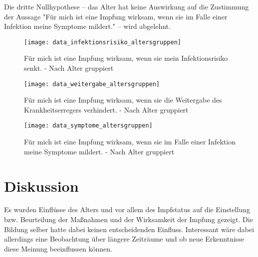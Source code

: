 Die dritte Nullhypothese -- das Alter hat keine Auswirkung auf die Zustimmung der Aussage "Für mich ist eine Impfung wirksam, wenn sie im Falle einer Infektion meine Symptome mildert." -- wird abgelehnt.

\begin{figure}[ht]
    \caption{Für mich ist eine Impfung wirksam, wenn sie mein Infektionsrisiko senkt. - Nach Alter gruppiert}
    \label{fig:vgl_infektionsrisiko_altersgruppen}
    \centering
    \texttt{[image: data\_infektionsrisiko\_altersgruppen]}
\end{figure}

\begin{figure}[ht]
    \caption{Für mich ist eine Impfung wirksam, wenn sie die Weitergabe des Krankheitserregers verhindert. - Nach Alter gruppiert}
    \label{fig:vgl_weitergabe_altersgruppen}
    \centering
    \texttt{[image: data\_weitergabe\_altersgruppen]}
\end{figure}

\begin{figure}[ht]
    \caption{Für mich ist eine Impfung wirksam, wenn sie im Falle einer Infektion meine Symptome mildert. - Nach Alter gruppiert}
    \label{fig:vgl_symptome_altersgruppen}
    \centering
    \texttt{[image: data\_symptome\_altersgruppen]}
\end{figure}

\newpage

\section{Diskussion}

Es wurden Einflüsse des Alters und vor allem des Impfstatus auf die Einstellung bzw. Beurteilung der Maßnahmen und der Wirksamkeit der Impfung gezeigt. Die Bildung selber hatte dabei keinen entscheidenden Einfluss.
Interessant wäre dabei allerdings eine Beobachtung über längere Zeiträume und ob neue Erkenntnisse diese Meinung beeinflussen können.

